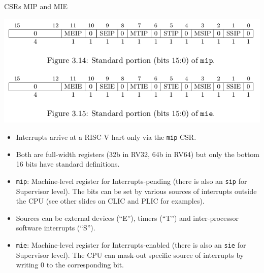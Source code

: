 \documentclass{article}
\begin{document}
\clearpage


\begin{center}
  {\Huge
    CSRs MIP and MIE}

  \vspace*{0.2in}

  \includegraphics[width=6in]{Figs/CSRs_MIP_MIE.png}

  \vspace*{0.3in}

  \begin{minipage}[t]{9.5in}
    \begin{itemize}\LARGE

    \item Interrupts arrive at a RISC-V hart only via the {\tt mip} CSR.

    \item Both are full-width registers (32b in RV32, 64b in RV64) but
      only the bottom 16 bits have standard definitions.

    \item {\tt mip}: Machine-level register for Interrupts-pending (there
      is also an {\tt sip} for Supervisor level).  The bits can be set
      by various sources of interrupts outside the CPU (see other slides
      on CLIC and PLIC for examples).

    \item Sources can be external devices (``E''), timers (``T'') and
      inter-processor software interrupts (``S'').

    \item {\tt mie}: Machine-level register for Interrupts-enabled (there
      is also an {\tt sie} for Supervisor level).  The CPU can mask-out
      specific source of interrupts by writing 0 to the corresponding
      bit.

    \end{itemize}

    \vspace{0.5in}

  \end{minipage}
\end{center}
\end{document}
